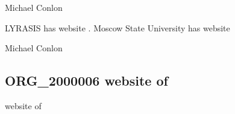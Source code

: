 \documentclass[letterpaper,10pt,english]{sphinxmanual}
\begin{document}
\begin{sphinxShadowBox}

\sphinxAtStartPar
Michael Conlon 
\end{sphinxShadowBox}

\begin{sphinxShadowBox}

\sphinxAtStartPar
{\hyperref[\detokenize{doc-ORG_0000001::doc}]{}}
\end{sphinxShadowBox}

\begin{sphinxShadowBox}

\sphinxAtStartPar
{\hyperref[\detokenize{doc-ORG_0000057::doc}]{}}
\end{sphinxShadowBox}

\begin{sphinxShadowBox}

\sphinxAtStartPar
{\hyperref[\detokenize{doc-ORG_2000006::doc}]{}}
\end{sphinxShadowBox}

\begin{sphinxShadowBox}

\sphinxAtStartPar
LYRASIS has website .  Moscow State University has website 
\end{sphinxShadowBox}

\begin{sphinxShadowBox}

\sphinxAtStartPar
Michael Conlon 
\end{sphinxShadowBox}
\begin{quote}

\ignorespaces \end{quote}


\subsection{ORG\_2000006 \sphinxhyphen{} website of}
\label{\detokenize{doc-ORG_2000006:org-2000006-website-of}}\label{\detokenize{doc-ORG_2000006:index-0}}\label{\detokenize{doc-ORG_2000006::doc}}
\begin{sphinxShadowBox}

\sphinxAtStartPar
website of
\end{sphinxShadowBox}
\end{document}
